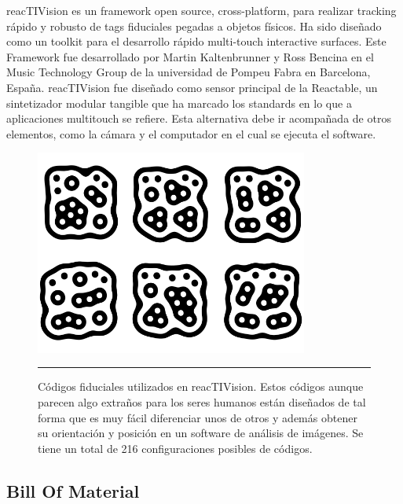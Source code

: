 reacTIVision \cite{kaltenbrunner2007reactivision} es un framework open source, cross-platform, para realizar tracking rápido y robusto de tags fiduciales pegadas a objetos físicos. Ha sido diseñado como un toolkit para el desarrollo rápido multi-touch interactive surfaces. Este Framework fue desarrollado por Martin Kaltenbrunner y Ross Bencina en el Music Technology Group de la universidad de Pompeu Fabra en Barcelona, España. reacTIVision fue diseñado como sensor principal de la Reactable, un sintetizador modular tangible que ha marcado los standards en lo que a aplicaciones multitouch se refiere. Esta alternativa debe ir acompañada de otros elementos, como la cámara y el computador en el cual se ejecuta el software. 


\begin{figure}[htbp]
	\centering
		\includegraphics[width=0.8\textwidth]{./Figures/MODI/fiducial.png}
		\rule{35em}{0.5pt}
	\caption[Fiduciales usados como tag en reacTIVision]{Códigos fiduciales utilizados en reacTIVision. Estos códigos aunque parecen algo extraños para los seres humanos están diseñados de tal forma que es muy fácil diferenciar unos de otros y además obtener su orientación y posición en un software de análisis de imágenes. Se tiene un total de 216 configuraciones posibles de códigos.}
	\label{fig:Fiducial}
\end{figure}




\subsection{Bill Of Material}

